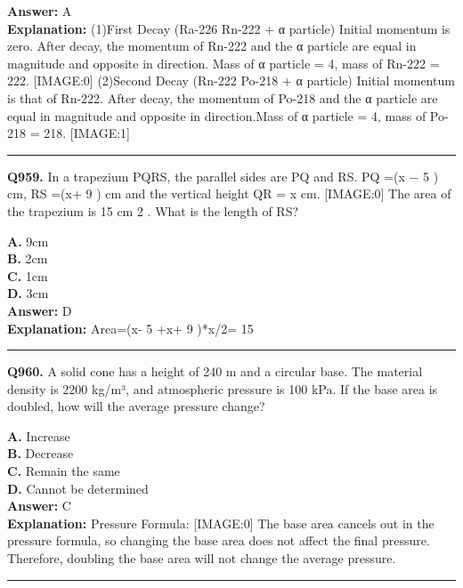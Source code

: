\documentclass[12pt]{article}
\begin{document}
\textbf{Answer:} A \\
\textbf{Explanation:} (1)First Decay (Ra-226 \to  Rn-222 + α particle)
Initial momentum is zero. After decay, the momentum of Rn-222 and the α particle are equal in magnitude and opposite in direction. Mass of α particle = 4, mass of Rn-222 = 222.
[IMAGE:0]
(2)Second Decay (Rn-222 \to  Po-218 + α particle)
Initial momentum is that of Rn-222. After decay, the momentum of Po-218 and the α particle are equal in magnitude and opposite in direction.Mass of α particle = 4, mass of Po-218 = 218.
[IMAGE:1]

\hrule
\vspace{1em}


\noindent
\textbf{Q959.} In a trapezium PQRS, the parallel sides are PQ and RS. PQ =(x
−
5
) cm, RS =(x+
9
) cm and the vertical height QR = x cm.
[IMAGE:0]
The area of the trapezium is
15
cm
2
. What is the length of RS?



\textbf{A.} 9cm \\
\textbf{B.} 2cm \\
\textbf{C.} 1cm \\
\textbf{D.} 3cm \\

\textbf{Answer:} D \\
\textbf{Explanation:} Area=(x-
5
+x+
9
)*x/2=
15

\hrule
\vspace{1em}


\noindent
\textbf{Q960.} A solid cone has a height of 240 m and a circular base. The material density is 2200 kg/m³, and atmospheric pressure is 100 kPa. If the base area is doubled, how will the average pressure change?



\textbf{A.} Increase \\
\textbf{B.} Decrease \\
\textbf{C.} Remain the same \\
\textbf{D.} Cannot be determined \\

\textbf{Answer:} C \\
\textbf{Explanation:} Pressure Formula:
[IMAGE:0]
The base area cancels out in the pressure formula, so changing the base area does not affect the final pressure. Therefore, doubling the base area will not change the average pressure.

\hrule
\vspace{1em}
\end{document}
